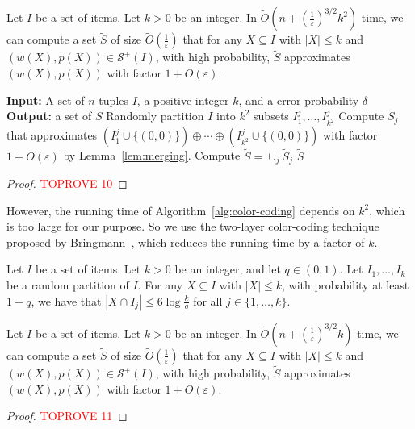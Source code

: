\documentclass[a4paper,UKenglish,cleveref, autoref, thm-restate, pdfa]{lipics-v2021}
\newcommand{\eps}{\varepsilon}
\renewcommand{\leq}{\leqslant}
\begin{document}
\begin{lemma}\label{lem:secend-layer-color-coding-algorithm}
    Let $I$ be a set of items. Let $k>0$ be an integer. In $\tilde{O}(n + (\frac{1}{\eps})^{3/2}k^2)$ time, we can compute a set $\tilde{S}$ of size $\tilde{O}(\frac{1}{\eps})$ that for any $X \subseteq I$ with $|X| \leq k$ and $(w(X),p(X))\in \mathcal{S}^+(I)$, with high probability, $\tilde{S}$ approximates $(w(X), p(X))$ with factor $1 + O(\eps)$.
\end{lemma}
\begin{algorithm}
\caption{$\mathtt{ColorCoding}(I, k, q)$~\cite{Bri17}}
\label{alg:color-coding}
    \begin{algorithmic}[1]
    \Statex \textbf{Input:} A set of $n$ tuples $I$, a positive integer $k$, and a error probability $\delta$
    \Statex \textbf{Output:} a set of $S$
           \State Randomly partition $I$ into $k^2$ subsets $I^j_1, \ldots, I^j_{k^2}$\;
           \State Compute $\tilde{S}_j$ that approximates $(I^j_1\cup\{(0,0)\}) \oplus \cdots \oplus (I^j_{k^2}\cup\{(0,0)\})$ with factor $1+O(\eps)$ by Lemma~\ref{lem:merging}.
        \EndFor
        \State Compute $\tilde{S} = \cup_j \tilde{S}_j$
  \State \Return $\tilde{S}$
  \end{algorithmic}
\end{algorithm}
\begin{proof}\textcolor{red}{TOPROVE 10}\end{proof}

However, the running time of Algorithm~\ref{alg:color-coding} depends on $k^2$, which is too large for our purpose. So we use the two-layer color-coding technique proposed by Bringmann~\cite{Bri17}, which reduces the running time by a factor of $k$.

\begin{lemma}\label{lem:first-layer-color-coding}
    Let $I$ be a set of items. Let $k>0$ be an integer, and let $q\in (0,1)$. Let $I_1,\ldots,I_{k}$ be a random partition of $I$. For any $X\subseteq I$ with $|X|\leq k$, with probability at least $1-q$, we have that
    \(
        |X\cap I_j| \leq 6\log\frac{k}{q}
    \)
    for all $j \in \{1,\ldots, k\}$.
\end{lemma}

\begin{lemma}\label{lem:first-layer-color-coding-algorithm}
    Let $I$ be a set of items. Let $k>0$ be an integer. In $\tilde{O}(n + (\frac{1}{\eps})^{3/2}k)$ time, we can compute a set $\tilde{S}$ of size $\tilde{O}(\frac{1}{\eps})$ that for any $X \subseteq I$ with $|X| \leq k$ and $(w(X),p(X))\in \mathcal{S}^+(I)$, with high probability, $\tilde{S}$ approximates $(w(X), p(X))$ with factor $1 + O(\eps)$.
\end{lemma}
\begin{proof}\textcolor{red}{TOPROVE 11}\end{proof}
\end{document}

